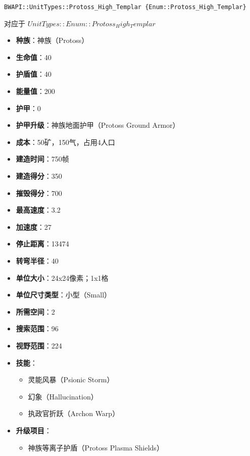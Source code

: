 \begin{tcolorbox}[colback=white, colframe=black!60!white, title=Protoss\_High\_Templar(), arc=0mm]
    \begin{verbatim}
BWAPI::UnitTypes::Protoss_High_Templar {Enum::Protoss_High_Templar}
    \end{verbatim}
    对应于  $ UnitTypes::Enum::Protoss_High_Templar $ 
    \begin{itemize}
        \item \textbf{种族}：神族（Protoss）
        \item \textbf{生命值}：40
        \item \textbf{护盾值}：40
        \item \textbf{能量值}：200
        \item \textbf{护甲}：0
        \item \textbf{护甲升级}：神族地面护甲（Protoss Ground Armor）
        \item \textbf{成本}：50矿，150气，占用4人口
        \item \textbf{建造时间}：750帧
        \item \textbf{建造得分}：350
        \item \textbf{摧毁得分}：700
        \item \textbf{最高速度}：3.2
        \item \textbf{加速度}：27
        \item \textbf{停止距离}：13474
        \item \textbf{转弯半径}：40
        \item \textbf{单位大小}：24x24像素；1x1格
        \item \textbf{单位尺寸类型}：小型（Small）
        \item \textbf{所需空间}：2
        \item \textbf{搜索范围}：96
        \item \textbf{视野范围}：224
        \item \textbf{技能}：
            \begin{itemize}
                \item 灵能风暴（Psionic Storm）
                \item 幻象（Hallucination）
                \item 执政官折跃（Archon Warp）
            \end{itemize}
        \item \textbf{升级项目}：
            \begin{itemize}
                \item 神族等离子护盾（Protoss Plasma Shields）

\end{itemize}
\end{itemize}
\end{tcolorbox}
